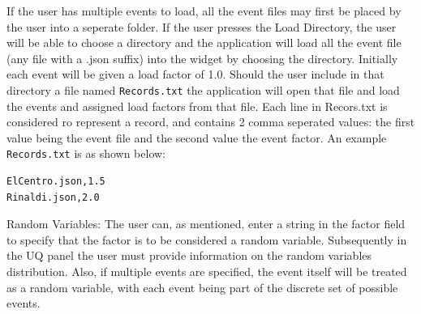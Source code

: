 If the user has multiple events to load, all the event files may first
be placed by the user into a seperate folder. If the user presses the
Load Directory, the user will be able to choose a directory and the
application will load all the event file (any file with a .json
suffix) into the widget by choosing the directory. Initially each
event will be given a load factor of 1.0.  Should the user include in
that directory a file named \texttt{Records.txt} the application will open that
file and load the events and assigned load factors from that
file. Each line in Recors.txt is considered ro represent a record, and
contains 2 comma seperated values: the first value being the event
file and the second value the event factor. An example \texttt{Records.txt} is
as shown below:

\begin{verbatim}
ElCentro.json,1.5
Rinaldi.json,2.0
\end{verbatim}

Random Variables: The user can, as mentioned, enter a string in the
factor field to specify that the factor is to be considered a random
variable. Subsequently in the UQ panel the user must provide
information on the random variables distribution. Also, if multiple
events are specified, the event itself will be treated as a random
variable, with each event being part of the discrete set of possible
events.
